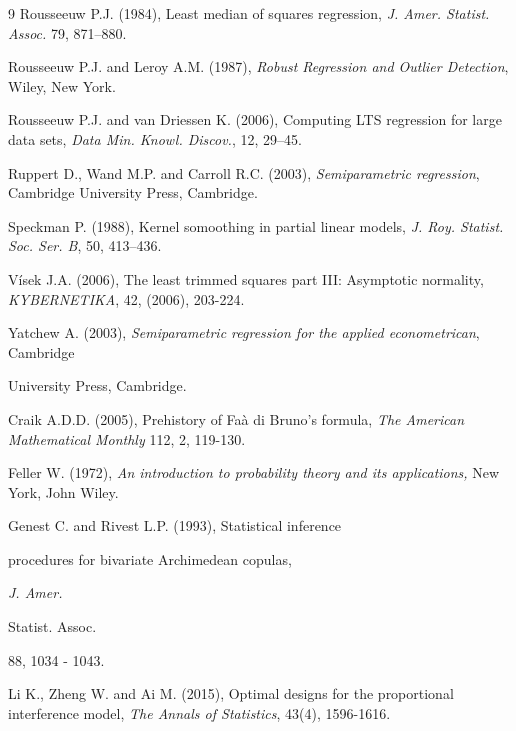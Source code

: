 \documentclass[10pt,twoside]{article}
\numberwithin{equation}{section}
\begin{document}
\begin{thebibliography}{9}
 Rousseeuw P.J. (1984), Least median of squares regression, {\it J. Amer. Statist. Assoc.} 79, 871–880.



 Rousseeuw P.J. and Leroy A.M. (1987), {\it Robust Regression and Outlier Detection}, Wiley, New York.

 Rousseeuw P.J. and van Driessen K. (2006), Computing LTS regression for large data sets, {\it Data Min. Knowl. Discov.}, 12, 29–45.



 Ruppert D., Wand M.P. and Carroll R.C. (2003), {\it Semiparametric regression}, Cambridge University Press, Cambridge.

 Speckman P. (1988), Kernel somoothing in partial linear models, {\it J. Roy. Statist. Soc. Ser. B}, 50, 413–436.

  V\'{i}sek J.A. (2006), The least trimmed squares part III: Asymptotic normality, {\it KYBERNETIKA}, {42}, (2006),  203-224.

 Yatchew A. (2003), {\it Semiparametric regression for the applied econometrican}, Cambridge

            University Press, Cambridge.

            







    

    


Craik A.D.D. (2005), Prehistory of Fa\`{a} di Bruno's formula, {\it The American Mathematical Monthly} 112, 2,  119-130.


Feller W. (1972), {\it An introduction to probability theory and its applications,} New York, John Wiley.


Genest C. and  Rivest L.P. (1993), Statistical inference

procedures for bivariate Archimedean copulas, {\it J. Amer.

Statist. Assoc.} 88,  1034 - 1043.




Li K., Zheng W. and Ai M. (2015), Optimal designs for the proportional interference model, {\it The Annals of Statistics}, 43(4), 1596-1616.

\end{thebibliography}
\end{document}
